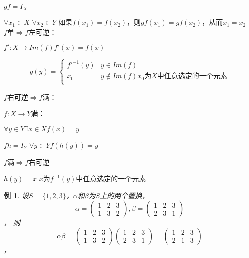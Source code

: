 \documentclass{article}
\newtheorem*{Example}{例}
\begin{document}
\begin{CJK*}{UTF8}{gbsn}
$gf=I_X$

$\forall x_1\in X$ $\forall x_2\in Y$ 如果$f(x_1)=f(x_2)$，则$gf(x_1)=gf(x_2)$，从而$x_1=x_2$
　
$f$单$\Rightarrow f$左可逆：

$f':X\to Im(f) f'(x) = f(x)$

\begin{equation*}
  g(y)=
  \begin{cases}
    f'^{-1}(y) & y \in Im(f)\\
    x_0 &y \notin Im(f) x_0\text{为}X\text{中任意选定的一个元素}\\
  \end{cases}
\end{equation*}


$f$右可逆$\Rightarrow f$满：


$f:X\to Y$满：

$\forall y \in Y \exists x \in X f(x) = y$

$fh=I_Y$  $\forall y\in Y f(h(y))=y$

$f$满$\Rightarrow f$右可逆

$h(y)=x$ $x$为$f^{-1}({y})$中任意选定的一个元素


  \begin{Example}
    设$S=\{1,2,3\}$，$\alpha$和$\beta$为$S$上的两个置换，
    \[\alpha=\begin{pmatrix}1&2&3\\1&3&2\end{pmatrix},\beta=\begin{pmatrix}1&2&3\\2&3&1\end{pmatrix}\]，
    则
    \[\alpha\beta=\begin{pmatrix}1&2&3\\1&3&2\end{pmatrix}\begin{pmatrix}1&2&3\\2&3&1\end{pmatrix}=\begin{pmatrix}1&2&3\\2&1&3\end{pmatrix}\]，    
  \end{Example}


\end{CJK*}
\end{document}
